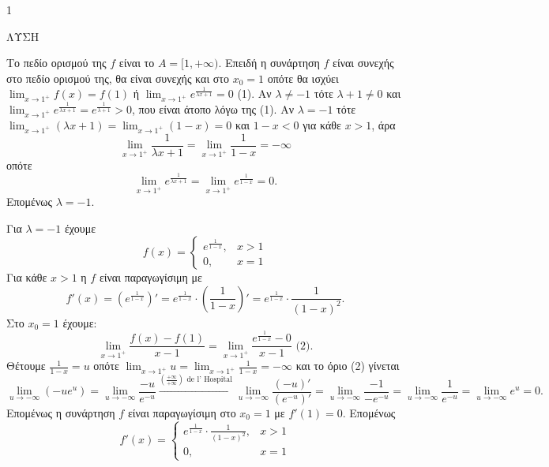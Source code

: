 \begin{ylh}{1}
    \item [Συνέχεια, Παραγωγισιμότητα, Μονοτονία, Σύνολο τιμών συνάρτησης]
\end{ylh}
ΛΥΣΗ
\begin{alist}
    \item Το πεδίο ορισμού της $f$ είναι το $A = [1, +\infty)$.
    Επειδή η συνάρτηση $f$ είναι συνεχής στο πεδίο ορισμού της, θα είναι συνεχής και στο $x_0 = 1$
    οπότε θα ισχύει $\lim_{x \to 1^+} f(x) = f(1)$ ή $\lim_{x \to 1^+} e^{\frac{1}{\lambda x + 1}} = 0$ (1).
    Αν $\lambda \neq -1$ τότε $\lambda + 1 \neq 0$ και $\lim_{x \to 1^+} e^{\frac{1}{\lambda x + 1}} = e^{\frac{1}{\lambda+1}} > 0$, που είναι άτοπο λόγω της (1).
    Αν $\lambda = -1$ τότε $\lim_{x \to 1^+} (\lambda x + 1) = \lim_{x \to 1^+} (1 - x) = 0$ και $1 - x < 0$ για κάθε $x > 1$, άρα
    \[ \lim_{x \to 1^+} \frac{1}{\lambda x + 1} = \lim_{x \to 1^+} \frac{1}{1 - x} = -\infty \]
    οπότε
    \[ \lim_{x \to 1^+} e^{\frac{1}{\lambda x + 1}} = \lim_{x \to 1^+} e^{\frac{1}{1 - x}} = 0. \]
    Επομένως $\lambda = -1$. 

    \item Για $\lambda = -1$ έχουμε
    \[ f(x) = \begin{cases} e^{\frac{1}{1-x}}, & x > 1 \\ 0, & x = 1 \end{cases} \]
    Για κάθε $x > 1$ η $f$ είναι παραγωγίσιμη με
    \[ f'(x) = \left(e^{\frac{1}{1-x}}\right)' = e^{\frac{1}{1-x}} \cdot \left(\frac{1}{1-x}\right)' = e^{\frac{1}{1-x}} \cdot \frac{1}{(1-x)^2}. \]
    Στο $x_0 = 1$ έχουμε:
    \[ \lim_{x \to 1^+} \frac{f(x)-f(1)}{x-1} = \lim_{x \to 1^+} \frac{e^{\frac{1}{1-x}}-0}{x-1} \text{ (2)}. \]
    Θέτουμε $\frac{1}{1-x} = u$ οπότε $\lim_{x \to 1^+} u = \lim_{x \to 1^+} \frac{1}{1-x} = -\infty$ και το όριο (2) γίνεται
    \[ \lim_{u \to -\infty} (-ue^u) = \lim_{u \to -\infty} \frac{-u}{e^{-u}} \xrightarrow{\left(\frac{+\infty}{+\infty}\right) \text{ de l' Hospital}} \lim_{u \to -\infty} \frac{(-u)'}{(e^{-u})'} = \lim_{u \to -\infty} \frac{-1}{-e^{-u}} = \lim_{u \to -\infty} \frac{1}{e^{-u}} = \lim_{u \to -\infty} e^u = 0. \]
    Επομένως η συνάρτηση $f$ είναι παραγωγίσιμη στο $x_0 = 1$ με $f'(1) = 0$.
    Επομένως
    \[ f'(x) = \begin{cases} e^{\frac{1}{1-x}} \cdot \frac{1}{(1-x)^2}, & x > 1 \\ 0, & x = 1 \end{cases} \] 


\end{alist}
